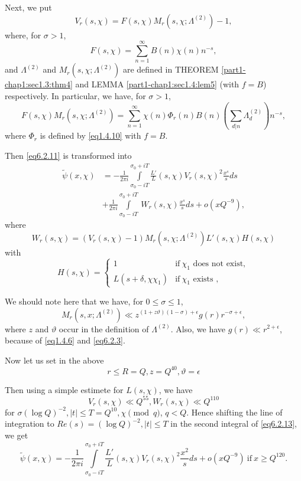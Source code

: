 Next, we put
$$
V_r(s,\chi) = F(s,\chi) M_r(s,\chi; \Lambda^{(2)}) -1,
$$
where, for $\sigma > 1$,
$$
F(s,\chi)= \sum_{n=1}^{\infty}B(n)\chi(n)n^{-s},
$$
and $\Lambda^{(2)}$ and $M_r(s,\chi;\Lambda^{(2)})$ are defined in
THEOREM \ref{part1-chap1:sec1.3:thm4} and LEMMA
\ref{part1-chap1:sec1.4:lem5} (with $f = B$) respectively. In
particular, 
we have, for $\sigma > 1$, 
\begin{equation*}
  F(s,\chi )M_r(s,\chi ; \Lambda^{(2)}) = \sum_{n=1}^{\infty}
  \chi(n)\Phi_r
  (n)B(n)\left(\sum_{d|n}\Lambda_d^{(2)}\right)n^{-s},\tag{6.2.12} \label{eq6.2.12} 
\end{equation*}
where $\Phi_r$ is defined by \eqref{eq1.4.10} with $f = B$.

Then \eqref{eq6.2.11} is transformed into
\begin{align*}
  \tilde{\psi}(x,\chi) & = - \frac{1}{2\pi i}\int\limits_{\sigma_0
    -iT}^{\sigma_0 + iT} \frac{L'}{L}(s,\chi )V_r(s,\chi )^2
  \frac{x^s}{s} ds\\ 
 & + \frac{1}{2\pi i}\int\limits_{\sigma_0 - iT}^{\sigma_0 + iT} ~
  W_r(s,\chi ) \frac{x^s}{s} ds + o(xQ^{-9}),\tag{6.2.13} \label{eq6.2.13}
\end{align*}
where
$$
W_r(s,\chi) = (V_r(s,\chi)-1)M_r(s,\chi; \Lambda^{(2)}) L'(s,\chi)H(s,\chi)
$$
with
$$
H(s, \chi)= 
\begin{cases} 
  1  &\text{if}~ \chi_1 \text{ does not exist},\\
  L(s+\delta,  \chi \chi_1)  & \text{if}~ \chi_1 \text { exists },
\end{cases}
$$\pageoriginale

We should note here that we have, for $0 \le \sigma \le 1$,
$$
M_r (s, x ;  \Lambda^{(2)}) \ll z ^{(1+z \vartheta)
  (1-\sigma)+\epsilon } g(r)r^{-\sigma + \epsilon }, 
$$
where $z$ and $\vartheta$ occur in the definition of $ \Lambda^{(2)}$.
Also, we have $g(r) \ll r^{2+\epsilon }$, because of \eqref{eq1.4.6} and
\eqref{eq6.2.3}. 

Now let us set in the above 
\begin{equation*}
r \le R= Q, z = Q^{40}, \vartheta = \epsilon  \tag{6.2.14}\label{eq6.2.14}
\end{equation*}

Then using a simple estimete for $L(s, \chi)$, we have
\begin{equation*}
  V_r (s,\chi) \ll Q^{55},  W_r (s, \chi) \ll Q^{110}
  \tag{6.2.15}\label{eq6.2.15} 
\end{equation*}
for $\sigma (\log Q)^{-2}, |t| \le T = Q^{10}, \chi \pmod{q}$, $q <
Q$. Hence shifting the line of integration to $Re(s) = (\log Q)^{-2},
|t| \le T$ in the second integral of \eqref{eq6.2.13}, we get 
$$
\tilde{\psi}(x,\chi)= - \frac{1}{2\pi i} \int\limits^{\sigma_0 + i
  T}_{\sigma_0 - iT} \frac{L'}{L} (s, \chi ) V_r (s, \chi)^2
\frac{x^2}{s} ds + o(xQ ^{-9})~ \text{if}~ x \ge Q^{120}. 
$$

